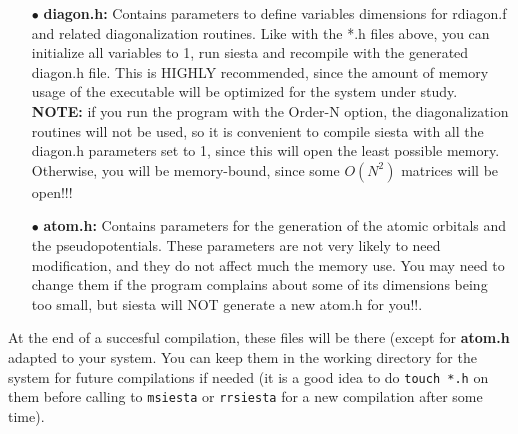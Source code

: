 \begin{itemize}
\item[$\bullet$] 
{\bf diagon.h:} Contains parameters to define variables dimensions for
rdiagon.f and related diagonalization routines. Like with the *.h
files above, you can initialize all variables to 1, run siesta and
recompile with the generated diagon.h file.  This is HIGHLY recommended,
since the amount of memory usage of the executable will be optimized 
for the system under study.  {\bf NOTE:} if you run the program 
with the Order-N option, the diagonalization routines will not be used, so
it is convenient to compile siesta with all the diagon.h parameters
set to 1, since this will open the least possible memory. Otherwise, 
you will be memory-bound, since some $O(N^2)$ matrices will be open!!!

\item[$\bullet$] 
{\bf atom.h:} Contains parameters for the generation of the atomic
orbitals and the pseudopotentials. These parameters are not very likely
to need modification, and they do not affect much the memory use.
You may need to change them if the program complains about some
of its dimensions being too small, but siesta will NOT generate
a new atom.h for you!!.

\end{itemize}

At the end of a succesful compilation, these files will be 
there (except for {\bf atom.h} adapted to your system. 
You can keep them in the working
directory for the system for future compilations if needed
(it is a good idea to do {\tt touch *.h} on them before
calling to {\tt msiesta} or {\tt rrsiesta} for a new compilation after
some time).



